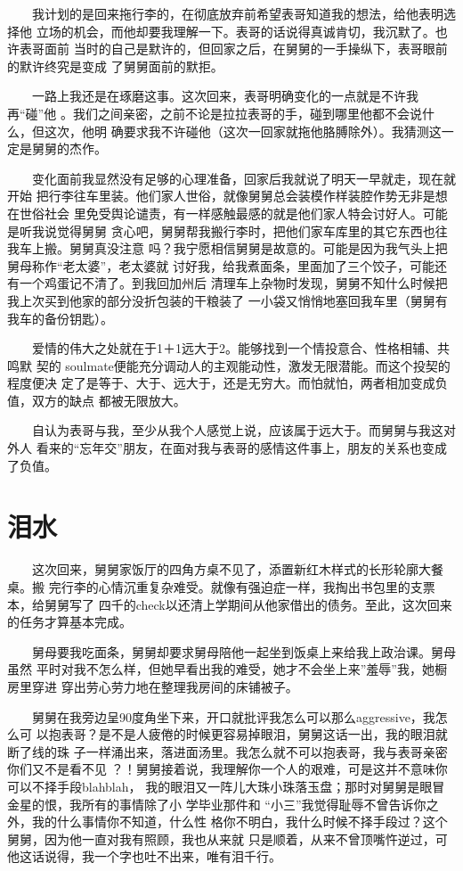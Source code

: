 \documentclass[12pt]{book}
\begin{document}
　　我计划的是回来拖行李的，在彻底放弃前希望表哥知道我的想法，给他表明选择他
立场的机会，而他却要我理解一下。表哥的话说得真诚肯切，我沉默了。也许表哥面前
当时的自己是默许的，但回家之后，在舅舅的一手操纵下，表哥眼前的默许终究是变成
了舅舅面前的默拒。

　　一路上我还是在琢磨这事。这次回来，表哥明确变化的一点就是不许我再“碰”他
。我们之间亲密，之前不论是拉拉表哥的手，碰到哪里他都不会说什么，但这次，他明
确要求我不许碰他（这次一回家就拖他胳膊除外）。我猜测这一定是舅舅的杰作。

　　变化面前我显然没有足够的心理准备，回家后我就说了明天一早就走，现在就开始
把行李往车里装。他们家人世俗，就像舅舅总会装模作样装腔作势无非是想在世俗社会
里免受舆论谴责，有一样感触最感的就是他们家人特会讨好人。可能是听我说觉得舅舅
贪心吧，舅舅帮我搬行李时，把他们家车库里的其它东西也往我车上搬。舅舅真没注意
吗？我宁愿相信舅舅是故意的。可能是因为我气头上把舅母称作“老太婆”，老太婆就
讨好我，给我煮面条，里面加了三个饺子，可能还有一个鸡蛋记不清了。到我回加州后
清理车上杂物时发现，舅舅不知什么时候把我上次买到他家的部分没折包装的干粮装了
一小袋又悄悄地塞回我车里（舅舅有我车的备份钥匙）。

　　爱情的伟大之处就在于1＋1远大于2。能够找到一个情投意合、性格相辅、共鸣默
契的 soulmate便能充分调动人的主观能动性，激发无限潜能。而这个投契的程度便决
定了是等于、大于、远大于，还是无穷大。而怕就怕，两者相加变成负值，双方的缺点
都被无限放大。

　　自认为表哥与我，至少从我个人感觉上说，应该属于远大于。而舅舅与我这对外人
看来的“忘年交”朋友，在面对我与表哥的感情这件事上，朋友的关系也变成了负值。
\section{泪水}
\label{sec-8-7}

　　这次回来，舅舅家饭厅的四角方桌不见了，添置新红木样式的长形轮廓大餐桌。搬
完行李的心情沉重复杂难受。就像有强迫症一样，我掏出书包里的支票本，给舅舅写了
四千的check以还清上学期间从他家借出的债务。至此，这次回来的任务才算基本完成。

　　舅母要我吃面条，舅舅却要求舅母陪他一起坐到饭桌上来给我上政治课。舅母虽然
平时对我不怎么样，但她早看出我的难受，她才不会坐上来”羞辱”我，她橱房里穿进
穿出劳心劳力地在整理我房间的床铺被子。

　　舅舅在我旁边呈90度角坐下来，开口就批评我怎么可以那么aggressive，我怎么可
以抱表哥？是不是人疲倦的时候更容易掉眼泪，舅舅这话一出，我的眼泪就断了线的珠
子一样涌出来，落进面汤里。我怎么就不可以抱表哥，我与表哥亲密你们又不是看不见
？！舅舅接着说，我理解你一个人的艰难，可是这并不意味你可以不择手段blahblah，
我的眼泪又一阵儿大珠小珠落玉盘；那时对舅舅是眼冒金星的恨，我所有的事情除了小
学毕业那件和 “小三”我觉得耻辱不曾告诉你之外，我的什么事情你不知道，什么性
格你不明白，我什么时候不择手段过？这个舅舅，因为他一直对我有照顾，我也从来就
只是顺着，从来不曾顶嘴忤逆过，可他这话说得，我一个字也吐不出来，唯有泪千行。
\end{document}
